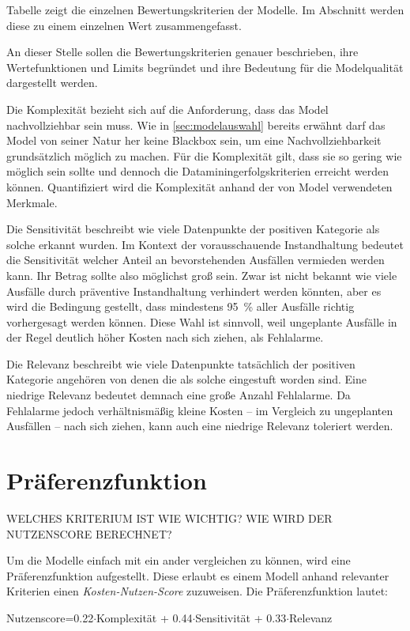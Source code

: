 Tabelle  zeigt die einzelnen Bewertungskriterien der Modelle. Im Abschnitt  werden diese zu einem einzelnen Wert zusammengefasst. 

An dieser Stelle sollen die Bewertungskriterien genauer beschrieben, ihre Wertefunktionen und Limits begründet und ihre Bedeutung für die Modelqualität dargestellt werden.

Die Komplexität bezieht sich auf die Anforderung, dass das Model nachvollziehbar sein muss. Wie in \cref{sec:modelauswahl} bereits erwähnt darf das Model von seiner Natur her keine Blackbox sein, um eine Nachvollziehbarkeit grundsätzlich möglich zu machen. Für die Komplexität gilt, dass sie so gering wie möglich sein sollte und dennoch die Dataminingerfolgskriterien erreicht werden können. Quantifiziert wird die Komplexität anhand der von Model verwendeten Merkmale. 

Die Sensitivität beschreibt wie viele Datenpunkte der positiven Kategorie als solche erkannt wurden. Im Kontext der vorausschauende Instandhaltung bedeutet die Sensitivität welcher Anteil an bevorstehenden Ausfällen vermieden werden kann. Ihr Betrag sollte also möglichst groß sein. Zwar ist nicht bekannt wie viele Ausfälle durch präventive Instandhaltung verhindert werden könnten, aber es wird die Bedingung gestellt, dass mindestens \SI{95}{\percent} aller Ausfälle richtig vorhergesagt werden können. Diese Wahl ist sinnvoll, weil ungeplante Ausfälle in der Regel deutlich höher Kosten nach sich ziehen, als Fehlalarme.

Die Relevanz beschreibt wie viele Datenpunkte tatsächlich der positiven Kategorie angehören von denen die als solche eingestuft worden sind. Eine niedrige Relevanz bedeutet demnach eine große Anzahl Fehlalarme. Da Fehlalarme jedoch verhältnismäßig kleine Kosten -- im Vergleich zu ungeplanten Ausfällen -- nach sich ziehen, kann auch eine niedrige Relevanz toleriert werden.


\section{Präferenzfunktion}
\label{sec:praeferenzfunktion}
WELCHES KRITERIUM IST WIE WICHTIG? WIE WIRD DER NUTZENSCORE BERECHNET?

Um die Modelle einfach mit ein ander vergleichen zu können, wird eine Präferenzfunktion aufgestellt. Diese erlaubt es einem Modell anhand relevanter Kriterien einen \textit{Kosten-Nutzen-Score} zuzuweisen. Die Präferenzfunktion lautet:
\begin{center}
    Nutzenscore=\num{0,22}$\cdot$Komplexität + \num{0,44}$\cdot$Sensitivität + \num{0,33}$\cdot$Relevanz
\end{center}

